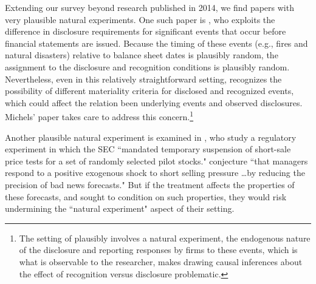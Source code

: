 \documentclass[12pt,reqno,titlepage]{amsart}
\theoremstyle{definition}
\begin{document}
\begin{doublespace}

Extending our survey beyond research published in 2014, we find papers with very plausible natural experiments.
One such paper is \citet{Michels:2015aa}, who exploits the difference in disclosure requirements for significant events that occur before financial statements are issued. 
Because the timing of these events (e.g., fires and natural disasters) relative to balance sheet dates is plausibly random, the assignment to the disclosure and recognition conditions is plausibly random. 
Nevertheless, even in this relatively straightforward setting, \citet{Michels:2015aa} recognizes the possibility of different materiality criteria for disclosed and recognized events, which could affect the relation been underlying events and observed disclosures. Michels' paper takes care to address this concern.\footnote{The setting of \citet{Michels:2015aa} plausibly involves a natural experiment, the endogenous nature of the disclosure and reporting responses by firms to these events, which is what is observable to the researcher, makes drawing causal inferences about the effect of recognition versus disclosure problematic.}

Another plausible natural experiment is examined in \citet[p.\,80]{Li:2015he}, who study a regulatory experiment in which the SEC ``mandated temporary suspension of short-sale price tests for a set of randomly selected pilot stocks." 
\citet[p.\,79]{Li:2015he} conjecture ``that managers respond to a positive exogenous shock to short selling pressure \dots by reducing the precision of bad news forecasts." 
But if the treatment affects the properties of these forecasts, and \citet[p.\,79]{Li:2015he} sought to condition on such properties, they would risk undermining the ``natural experiment" aspect of their setting.


\end{doublespace}
\end{document}

